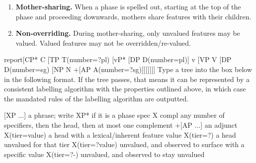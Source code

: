 \begin{enumerate}

    \item \textbf{Mother-sharing.} When a phase is spelled out, starting at the top of the phase and proceeding downwards, mothers share features with their children. 
        

    \item \textbf{Non-overriding.} During mother-sharing, only unvalued features may be valued. Valued features may not be overridden/re-valued. 






\end{enumerate}

\begin{tryit}{report}{[CP* C [TP T(number=?pl) [vP* [DP D(number=pl)] v [VP V [DP D(number=sg) [NP N +[AP A(number=?sg)]]]]]]]}
Type a tree into the box below in the following format. If the tree passes, that means it can be represented by a consistent labelling algorithm with the properties outlined above, in which case the mandated rules of the labelling algorithm are outputted. 

  [XP ...]          a phrase; write XP* if it is a phase
  spec X compl      any number of specifiers, then the head, then at most one complement
  +[AP ...]         an adjunct
  X(tier=value)     a head with a lexical/inherent feature value
  X(tier=?)         a head unvalued for that tier
  X(tier=?value)    unvalued, and observed to surface with a specific value
  X(tier=?-)        unvalued, and observed to stay unvalued
\end{tryit}

